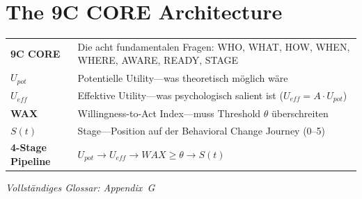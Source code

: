 %
%
%
%

\section{The 9C CORE Architecture}
\label{sec:8c-core}

\begin{tcolorbox}[colback=gray!5!white, colframe=gray!75!black,
    title=\textbf{Begriffe in diesem Kapitel}]

\small
\begin{tabular}{@{}p{3cm}p{9.5cm}@{}}
\textbf{9C CORE} & Die acht fundamentalen Fragen: WHO, WHAT, HOW, WHEN, WHERE, AWARE, READY, STAGE \\[3pt]
\textbf{$U_{pot}$} & Potentielle Utility---was theoretisch möglich wäre \\[3pt]
\textbf{$U_{eff}$} & Effektive Utility---was psychologisch salient ist ($U_{eff} = A \cdot U_{pot}$) \\[3pt]
\textbf{WAX} & Willingness-to-Act Index---muss Threshold $\theta$ überschreiten \\[3pt]
\textbf{$S(t)$} & Stage---Position auf der Behavioral Change Journey (0--5) \\[3pt]
\textbf{4-Stage Pipeline} & $U_{pot} \rightarrow U_{eff} \rightarrow WAX \geq \theta \rightarrow S(t)$ \\
\end{tabular}

\vspace{3pt}
\textit{Vollständiges Glossar: Appendix~G}
\end{tcolorbox}

